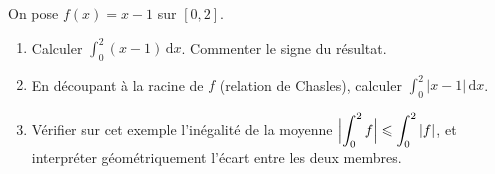 \documentclass[11pt,a4paper]{article}
\newcommand{\dd}{\mathrm{d}}
\begin{document}
\begin{exo}
On pose $f(x)=x-1$ sur $[0,2]$.
\begin{enumerate}[label=\alph*),leftmargin=1.8em]
  \item Calculer $\displaystyle\int_0^2 (x-1)\,\dd x$. Commenter le signe du résultat.
  \item En découpant à la racine de $f$ (relation de Chasles), calculer
        $\displaystyle\int_0^2 |x-1|\,\dd x$.
  \item Vérifier sur cet exemple l'inégalité de la moyenne
        $\Bigl|\displaystyle\int_0^2 f\Bigr|\leqslant\displaystyle\int_0^2 |f|$, et interpréter
        géométriquement l'écart entre les deux membres.
\end{enumerate}
\end{exo}
\end{document}
